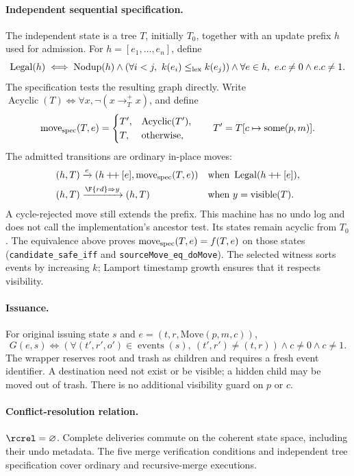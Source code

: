 \paragraph{Independent sequential specification.}
The independent state is a tree $T$, initially $T_0$, together with an update
prefix $h$ used for admission. For $h=[e_1,\ldots,e_n]$, define
\[
\operatorname{Legal}(h)\iff\operatorname{Nodup}(h)
\land(\forall i<j,\ k(e_i)\le_{\rm lex}k(e_j))
\land\forall e\in h,\ e.c\ne0\land e.c\ne1.
\]
The specification tests the resulting graph directly. Write
$\operatorname{Acyclic}(T)\iff\forall x,\neg(x\to_T^+x)$, and define
\[
\operatorname{move}_{\rm spec}(T,e)=
\begin{cases}
T',&\operatorname{Acyclic}(T'),\\
T,&\text{otherwise},
\end{cases}
\qquad T'=T[c\mapsto\operatorname{some}(p,m)].
\]
The admitted transitions are ordinary in-place moves:
\[
\begin{aligned}
(h,T)&\xrightarrow{e}(h\mathbin{+\!+}[e],\operatorname{move}_{\rm spec}(T,e))
 &&\text{when }\operatorname{Legal}(h\mathbin{+\!+}[e]),\\
(h,T)&\xrightarrow{\F{rd}\Rightarrow y}(h,T)
 &&\text{when }y=\operatorname{visible}(T).
\end{aligned}
\]
A cycle-rejected move still extends the prefix. This machine has no undo
log and does not call the implementation's ancestor test. Its states remain
acyclic from $T_0$. The equivalence above proves
$\operatorname{move}_{\rm spec}(T,e)=f(T,e)$ on those states
(\texttt{candidate\_safe\_iff} and \texttt{sourceMove\_eq\_doMove}).
The selected witness sorts events by increasing $k$; Lamport timestamp
growth ensures that it respects visibility.

\paragraph{Issuance.}
For original issuing state $s$ and $e=(t,r,\mathrm{Move}(p,m,c))$,
\[
G(e,s)\iff
 (\forall(t',r',o')\in\operatorname{events}(s),\ (t',r')\ne(t,r))
 \land c\ne0\land c\ne1.
\]
The wrapper reserves root and trash as children and requires a fresh event
identifier. A destination need not exist or be visible; a hidden child may
be moved out of trash. There is no additional visibility guard on $p$ or $c$.

\paragraph{Conflict-resolution relation.}
$\rcrel=\varnothing$. Complete deliveries commute on the coherent state
space, including their undo metadata. The five merge verification conditions
and independent tree specification cover ordinary and recursive-merge
executions.

